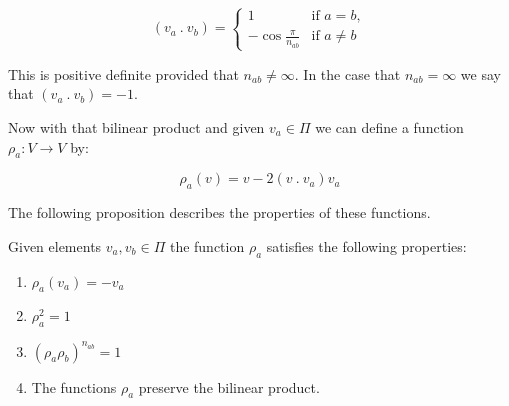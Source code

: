\documentclass[a4paper,12pt]{article}
\begin{document}
\begin{equation*}
	\left(v_a \: . \: v_b\right) = 
	\begin{cases}
		1 & \text{if $a = b$}, \\
		-\cos{\frac{\pi}{n_{ab}}} & \text{if $a \neq b$}
	\end{cases}
\end{equation*}

This is positive definite provided that $n_{ab} \neq \infty$. In the case that $n_{ab} = \infty$ we say that $\left(v_a \: . \: v_b\right) = -1$.

Now with that bilinear product and given $v_a \in \Pi$ we can define a function $\rho_a : V \rightarrow V$ by:

\begin{equation*}
	\rho_a(v) = v - 2(v \: . \: v_a)v_a
\end{equation*}

The following proposition describes the properties of these functions.

\begin{prop}
	Given elements $v_a, v_b \in \Pi$ the function $\rho_a$ satisfies the following properties:
	\begin{enumerate}
		\item $\rho_a\left(v_a\right) = -v_a$
		\item $\rho_a ^ 2 = 1$
		\item $\left(\rho_a\rho_b\right) ^ {n_{ab}} = 1$
		\item The functions $\rho_a$ preserve the bilinear product.
	\end{enumerate}
\end{prop}
\end{document}
